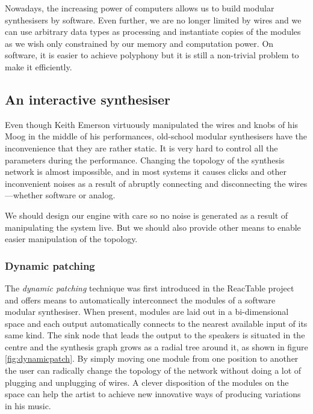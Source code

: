 Nowadays, the increasing power of computers allows us to build modular
synthesisers by software. Even further, we are no longer limited by
wires and we can use arbitrary data types as processing and
instantiate copies of the modules as we wish only constrained by our
memory and computation power. On software, it is easier to achieve
polyphony but it is still a non-trivial problem to make it
efficiently.

\subsection{An interactive synthesiser}

Even though Keith Emerson virtuously manipulated the wires and knobs
of his Moog in the middle of his performances, old-school modular
synthesisers have the inconvenience that they are rather static. It is
very hard to control all the parameters during the
performance. Changing the topology of the synthesis network is almost
impossible, and in most systems it causes clicks and other
inconvenient noises as a result of abruptly connecting and
disconnecting the wires ---whether software or analog.

We should design our engine with care so no noise is generated as a
result of manipulating the system live. But we should also provide
other means to enable easier manipulation of the topology.

\subsubsection{Dynamic patching}

The \emph{dynamic patching} \cite{kaltenbrunner04dynamic} technique
was first introduced in the ReacTable project and offers means to
automatically interconnect the modules of a software modular
synthesiser. When present, modules are laid out in a bi-dimensional
space and each output automatically connects to the nearest available
input of its same kind. The sink node that leads the output to the
speakers is situated in the centre and the synthesis graph grows as a
radial tree around it, as shown in figure \ref{fig:dynamicpatch}. By
simply moving one module from one position to another the user can
radically change the topology of the network without doing a lot of
plugging and unplugging of wires. A clever disposition of the modules
on the space can help the artist to achieve new innovative ways of
producing variations in his music.

